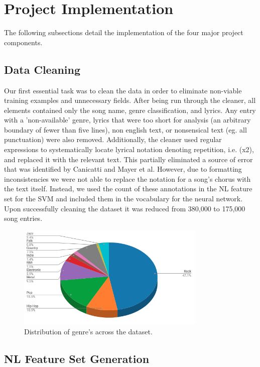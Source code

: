\documentclass[journal]{IEEEtran}
\begin{document}
\section{Project Implementation}
The following subsections detail the implementation of the four major project components. 

\subsection{Data Cleaning}

Our first essential task was to clean the data in order to eliminate non-viable training examples and unnecessary fields. After being run through the cleaner, all elements contained only the song name, genre classification, and lyrics. Any entry with a 'non-available' genre, lyrics that were too short for analysis (an arbitrary boundary of fewer than five lines), non english text, or nonsensical text (eg. all punctuation) were also removed. Additionally, the cleaner used regular expressions to systematically locate lyrical notation denoting repetition, i.e. (x2), and replaced it with the relevant text. This partially eliminated a source of error that was identified by Canicatti and Mayer et al. However, due to formatting inconsistencies we were not able to replace the notation for a song's chorus with the text itself. Instead, we used the count of these annotations in the NL feature set for the SVM and included them in the vocabulary for the neural network. Upon successfully cleaning the dataset it was reduced from 380,000 to 175,000 song entries.

\begin{figure}[h]
\centering
\includegraphics[width=9cm]{Figure_1}
\caption{Distribution of genre's across the dataset.}
\end{figure}

\subsection{NL Feature Set Generation}
\end{document}
